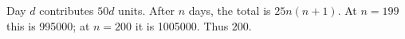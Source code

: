 Day $d$ contributes $50d$ units. After $n$ days, the total is $25n(n+1)$. At $n=199$ this is 995000; at $n=200$ it is 1005000. Thus $\boxed{200}$.
